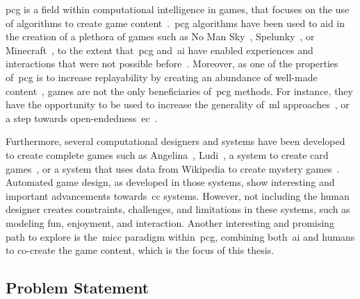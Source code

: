 \acrfull{pcg} is a field within computational intelligence in games, that focuses on the use of algorithms to create game content~\cite{Yannakakis2018}.~\acrshort{pcg} algorithms have been used to aid in the creation of a plethora of games such as No Man Sky~\cite{nomansky}, Spelunky~\cite{spelunky}, or Minecraft~\cite{minecraft}, to the extent that~\acrshort{pcg} and~\acrshort{ai} have enabled experiences and interactions that were not possible before~\cite{aidungeon,rogue,elite}. Moreover, as one of the properties of~\acrshort{pcg} is to increase replayability by creating an abundance of well-made content~\cite{shaker_procedural_2016}, games are not the only beneficiaries of~\acrshort{pcg} methods. For instance, they have the opportunity to be used to increase the generality of~\acrfull{ml} approaches~\cite{Risi2020-pcgGeneralityML}, or a step towards open-endedness~\acrfull{ec}~\cite{clune2019-aigas}. 

Furthermore, several computational designers and systems have been developed to create complete games such as Angelina~\cite{Cook2016-Angelina1}, Ludi~\cite{Browne2010-ludii}, a system to create card games~\cite{font2013-GenCardGames}, or a system that uses data from Wikipedia to create mystery games~\cite{barros2018-DATAeinstein}. Automated game design, as developed in those systems, show interesting and important advancements towards~\acrshort{cc} systems. However, not including the human designer creates constraints, challenges, and limitations in these systems, such as modeling fun, enjoyment, and interaction. Another interesting and promising path to explore is the~\acrlong{micc} paradigm within~\acrshort{pcg}, combining both~\acrshort{ai} and humans to co-create the game content, which is the focus of this thesis.

\subsection{Problem Statement} \label{sec:problemst}

